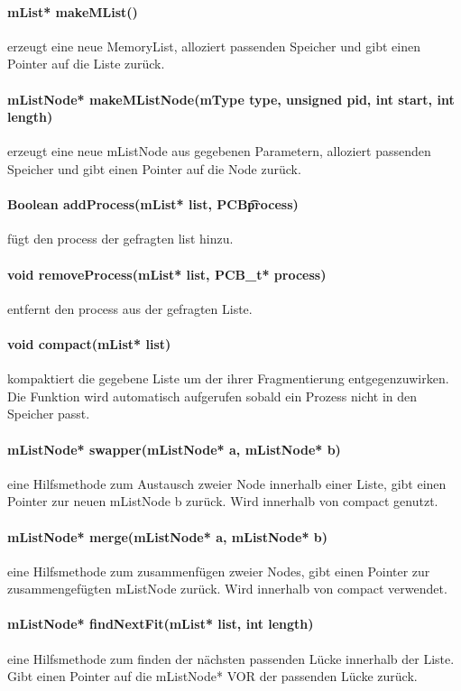 \paragraph{mList* makeMList()} erzeugt eine neue MemoryList, alloziert passenden Speicher und gibt einen Pointer auf die Liste zurück.

\paragraph{mListNode* makeMListNode(mType type, unsigned pid, int start, int length)} erzeugt eine neue mListNode aus gegebenen Parametern, alloziert passenden Speicher und gibt einen Pointer auf die Node zurück.

\paragraph{Boolean addProcess(mList* list, PCB\t* process)} fügt den process der gefragten list hinzu.

\paragraph{void removeProcess(mList* list, PCB\_t* process)} entfernt den process aus der gefragten Liste.

\paragraph{void compact(mList* list)} kompaktiert die gegebene Liste um der ihrer Fragmentierung entgegenzuwirken. Die Funktion wird automatisch aufgerufen sobald ein Prozess nicht in den Speicher passt.

\paragraph{mListNode* swapper(mListNode* a, mListNode* b)} eine Hilfsmethode zum Austausch zweier Node innerhalb einer Liste, gibt einen Pointer zur neuen mListNode b zurück. Wird innerhalb von compact genutzt.

\paragraph{mListNode* merge(mListNode* a, mListNode* b)} eine Hilfsmethode zum zusammenfügen zweier Nodes, gibt einen Pointer zur zusammengefügten mListNode zurück. Wird innerhalb von compact verwendet.

\paragraph{mListNode* findNextFit(mList* list, int length)} eine Hilfsmethode zum finden der nächsten passenden Lücke innerhalb der Liste. Gibt einen Pointer auf die mListNode* VOR der passenden Lücke zurück.
